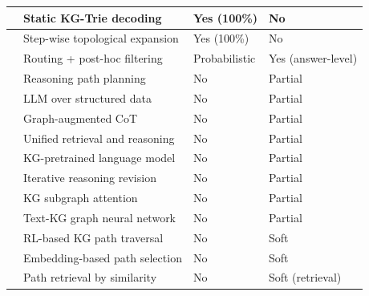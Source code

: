 \begin{longtable}[htpb]{|>{\raggedright\arraybackslash}p{3.5cm}|>{\raggedright\arraybackslash}p{4cm}|>{\raggedright\arraybackslash}p{3cm}|>{\raggedright\arraybackslash}p{3cm}|}
  \citet{luo2025-graph-constrained-reasoning} & Static KG-Trie decoding          & Yes (100\%)                      & No                             \\ \hline
  \citet{li2024-decoding-on-graphs}           & Step-wise topological expansion  & Yes (100\%)                      & No                             \\ \hline
  \citet{yuan2026routerkgqa}                  & Routing + post-hoc filtering     & Probabilistic                    & Yes (answer-level)             \\ \hline
  \citet{luo2024rog}                          & Reasoning path planning          & No                               & Partial                        \\ \hline
  \citet{jiang2023structgpt}                  & LLM over structured data         & No                               & Partial                        \\ \hline
  \citet{jin2024graphcot}                     & Graph-augmented CoT              & No                               & Partial                        \\ \hline
  \citet{jiang2022unikgqa}                    & Unified retrieval and reasoning  & No                               & Partial                        \\ \hline
  \citet{wang2021kepler}                      & KG-pretrained language model     & No                               & Partial                        \\ \hline
  \citet{mavromatis2022rearev}                & Iterative reasoning revision     & No                               & Partial                        \\ \hline
  \citet{he2021multihop}                      & KG subgraph attention            & No                               & Partial                        \\ \hline
  \citet{yasunaga2021qagnn}                   & Text-KG graph neural network     & No                               & Partial                        \\ \hline
  \citet{das2017go}                           & RL-based KG path traversal       & No                               & Soft                           \\ \hline
  \citet{saxena2022kgqa}                      & Embedding-based path selection   & No                               & Soft                           \\ \hline
  \citet{shi2021kgpath}                       & Path retrieval by similarity     & No                               & Soft (retrieval)               \\ \hline

\end{longtable}

